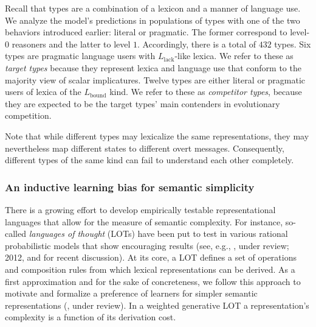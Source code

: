 \documentclass[a4paper, 11pt]{article}
\theoremstyle{Satz}
\newcommand{\mylang}[1]{\ensuremath{L_{\text{#1}}}\xspace} %
\newcommand{\Lall}{\mylang{all}}
\newcommand{\Lbound}{\mylang{bound}}
\newcommand{\Llack}{\mylang{lack}}
\begin{document}

Recall that types are a combination of a lexicon and a manner of language use. We analyze the
model's predictions in populations of types with one of the two behaviors introduced earlier:
literal or pragmatic. The former correspond to level-$0$ reasoners and the latter to level $1$. Accordingly, there is a total of $432$ types. Six types are pragmatic language
users with $\Llack$-like lexica. We refer to these as \emph{target types} because they
represent lexica and language use that conform to the majority view of scalar
implicatures. Twelve types are either literal or pragmatic users of lexica of the
$\Lbound$ kind. We refer to these as \emph{competitor types}, because they are expected to be
the target types' main contenders in evolutionary competition. 

Note that while different types may lexicalize the same representations, they may nevertheless
map different states to different overt messages. Consequently, different types of the same
kind can fail to understand each other completely.




\subsubsection{An inductive learning bias for semantic simplicity}
\label{sec:an-induct-learn}

There is a growing effort to develop empirically testable representational languages that allow
for the measure of semantic complexity. For instance, so-called {\em languages of thought}
(LOTs) have been put to test in various rational probabilistic models that show encouraging
results (see, e.g., \citealt{katz+etal:2008}, \citeauthor{piantadosi+etal:underreview} under review; 2012, and \citealt{piantadosi+jacobs:2016} for recent discussion). At its
core, a LOT defines a set of operations and composition rules from which lexical representations can be
derived. As a first approximation and for the sake of concreteness, we follow this approach to
motivate and formalize a preference of learners for simpler semantic representations
(\citealt{feldman:2000, chater+vitanyi:2003, piantadosi+etal:2012a,kirby+etal:2015}, \citeauthor{piantadosi+etal:underreview} under review). 
In a weighted generative LOT a representation's complexity is a function of its derivation cost.
\end{document}
